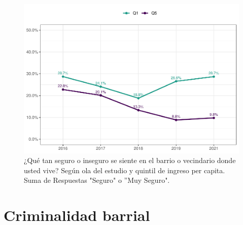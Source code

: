 \documentclass[
  12pt,
]{book}
\begin{document}
\begin{figure}

{\centering \includegraphics{reporte-elsoc_files/figure-latex/seguri-quintil-1} 

}

\caption{¿Qué tan seguro o inseguro se siente en el barrio o vecindario donde usted vive? Según ola del estudio y quintil de ingreso per capita. Suma de Respuestas "Seguro" o ”Muy Seguro".}\label{fig:seguri-quintil}
\end{figure}

\hypertarget{criminalidad-barrial}{%
\section{Criminalidad barrial}\label{criminalidad-barrial}}
\end{document}
